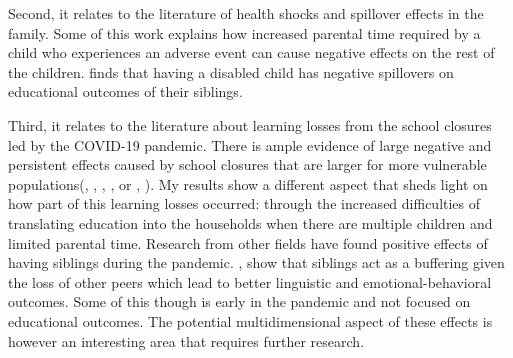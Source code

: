Second, it relates to the literature of health shocks and spillover effects in the family. Some of this work explains how increased parental time required by a child who experiences an adverse event can cause negative effects on the rest of the children. \cite{black_sibling_2021} finds that having a disabled child has negative spillovers on educational outcomes of their siblings.

Third, it relates to the literature about learning losses from the school closures led by the COVID-19 pandemic. There is ample evidence of large negative and persistent effects caused by school closures that are larger for more vulnerable populations(\cite{haelermans_inequality_2022}, \cite{jakubowski_global_2023}, \cite{goldhaber_educational_2023}, \cite{jack_pandemic_2023}, \cite{lichand_impacts_2021} or \cite{lichand_lasting_2024}, \cite{singh_covid-19_2022}). My results show a different aspect that sheds light on how part of this learning losses occurred: through the increased difficulties of translating education into the households when there are multiple children and limited parental time. Research from other fields have found positive effects of having siblings during the pandemic. \cite{hughes_siblings_2023}, \cite{lampis_long-lasting_2023} show that siblings act as a buffering given the loss of other peers which lead to better linguistic and emotional-behavioral outcomes. Some of this though is early in the pandemic and not focused on educational outcomes. The potential multidimensional aspect of these effects is however an interesting area that requires further research.





